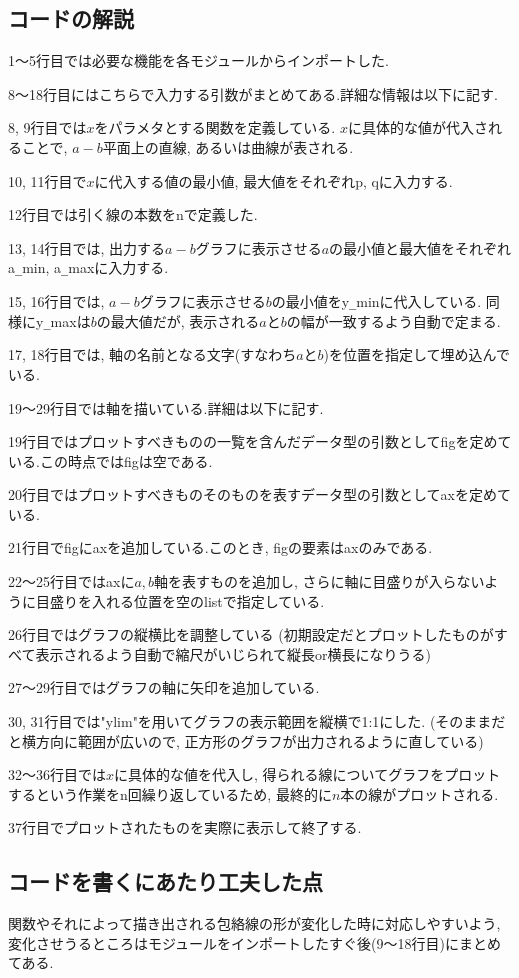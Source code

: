 \documentclass[11pt,a4j,fleqn]{jarticle}
\begin{document}
\subsection{コードの解説}
1～5行目では必要な機能を各モジュールからインポートした.

8～18行目にはこちらで入力する引数がまとめてある.詳細な情報は以下に記す.

8, 9行目では$x$をパラメタとする関数を定義している. $x$に具体的な値が代入されることで, $a-b$平面上の直線, あるいは曲線が表される.

10, 11行目で$x$に代入する値の最小値, 最大値をそれぞれp, qに入力する.

12行目では引く線の本数をnで定義した.

13, 14行目では, 出力する$a-b$グラフに表示させる$a$の最小値と最大値をそれぞれa\verb|_|min, a\verb|_|maxに入力する.

15, 16行目では, $a-b$グラフに表示させる$b$の最小値をy\verb|_|minに代入している. 
同様にy\verb|_|maxは$b$の最大値だが, 表示される$a$と$b$の幅が一致するよう自動で定まる.

17, 18行目では, 軸の名前となる文字(すなわち$a$と$b$)を位置を指定して埋め込んでいる.

19～29行目では軸を描いている.詳細は以下に記す.

19行目ではプロットすべきものの一覧を含んだデータ型の引数としてfigを定めている.この時点ではfigは空である.

20行目ではプロットすべきものそのものを表すデータ型の引数としてaxを定めている.

21行目でfigにaxを追加している.このとき, figの要素はaxのみである.

22～25行目ではaxに$a, b$軸を表すものを追加し, さらに軸に目盛りが入らないように目盛りを入れる位置を空のlistで指定している.

26行目ではグラフの縦横比を調整している
(初期設定だとプロットしたものがすべて表示されるよう自動で縮尺がいじられて縦長or横長になりうる)

27～29行目ではグラフの軸に矢印を追加している.

30, 31行目では"ylim"を用いてグラフの表示範囲を縦横で1:1にした. 
(そのままだと横方向に範囲が広いので, 正方形のグラフが出力されるように直している)

32～36行目では$x$に具体的な値を代入し, 得られる線についてグラフをプロットするという作業をn回繰り返しているため, 
最終的に$n$本の線がプロットされる.

37行目でプロットされたものを実際に表示して終了する.

\subsection{コードを書くにあたり工夫した点}
関数やそれによって描き出される包絡線の形が変化した時に対応しやすいよう, 
変化させうるところはモジュールをインポートしたすぐ後(9～18行目)にまとめてある.
\end{document}
